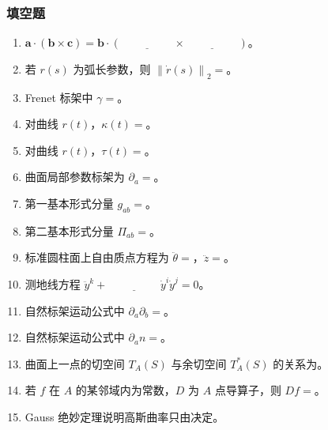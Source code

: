 \documentclass[UTF8,12pt,a4paper]{ctexart}
\newcommand{\vct}[1]{\boldsymbol{#1}}
\newcommand{\norm}[1]{\left\lVert #1\right\rVert}
\begin{document}
\subsubsection*{填空题}
\begin{enumerate}
\item $\vct a\cdot(\vct b\times\vct c)=\vct b\cdot(\underline{\hspace{2cm}}\times\underline{\hspace{2cm}})$。
\item 若 $r(s)$ 为弧长参数，则 $\norm{\dot r(s)}_2=$\underline{\hspace{2cm}}。
\item Frenet 标架中 $\gamma=$\underline{\hspace{3cm}}。
\item 对曲线 $r(t)$，$\kappa(t)=$\underline{\hspace{5cm}}。
\item 对曲线 $r(t)$，$\tau(t)=$\underline{\hspace{5cm}}。
\item 曲面局部参数标架为 $\partial_a=$\underline{\hspace{5cm}}。
\item 第一基本形式分量 $g_{ab}=$\underline{\hspace{4cm}}。
\item 第二基本形式分量 $\Pi_{ab}=$\underline{\hspace{4cm}}。
\item 标准圆柱面上自由质点方程为 $\ddot\theta=$\underline{\hspace{1cm}}，$\ddot z=$\underline{\hspace{1cm}}。
\item 测地线方程 $\ddot y^k+\underline{\hspace{2cm}}\dot y^i\dot y^j=0$。
\item 自然标架运动公式中 $\partial_a\partial_b=$\underline{\hspace{5cm}}。
\item 自然标架运动公式中 $\partial_an=$\underline{\hspace{5cm}}。
\item 曲面上一点的切空间 $T_A(S)$ 与余切空间 $T_A^*(S)$ 的关系为\underline{\hspace{3cm}}。
\item 若 $f$ 在 $A$ 的某邻域内为常数，$D$ 为 $A$ 点导算子，则 $Df=$\underline{\hspace{2cm}}。
\item Gauss 绝妙定理说明高斯曲率只由\underline{\hspace{3cm}}决定。
\end{enumerate}
\end{document}

